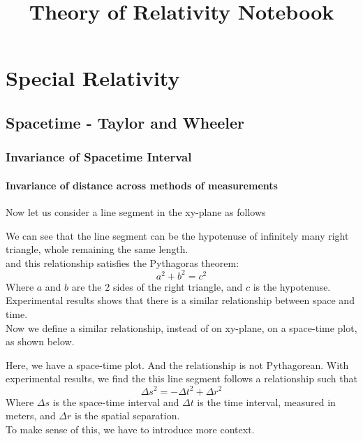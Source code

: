 \documentclass[12pt]{book}
\title{\textbf{Theory of Relativity Notebook}}
\author{Dennis Li \thanks{Prof. Gabriel Perez-Giz \and Manu Dorghabekov}}
\begin{document}
\maketitle
\tableofcontents

\part{Special Relativity}
\chapter{Spacetime - Taylor and Wheeler}
\section{Invariance of Spacetime Interval}

\subsection{Invariance of distance across methods of measurements}

Now let us consider a line segment in the xy-plane as follows
\begin{center}
\end{center}

We can see that the line segment can be the hypotenuse of infinitely many right triangle, whole remaining the same length.\\
and this relationship satisfies the Pythagoras theorem:
\[
a^2+b^2=c^2
\]
Where $a$ and $b$ are the 2 sides of the right triangle, and $c$ is the hypotenuse.\\
Experimental results shows that there is a similar relationship between space and time.\\
Now we define a similar relationship, instead of on xy-plane, on a space-time plot, as shown below. 
\begin{center}
\end{center}
Here, we have a space-time plot. And the relationship is not Pythagorean. With experimental results, we find the this line segment follows a relationship such that
\[
\Delta s^2=-\Delta t^2 + \Delta r^2
\]
Where $\Delta s$ is the space-time interval and $\Delta t$ is the time interval, measured in meters, and $\Delta r$ is the spatial separation.\\
To make sense of this, we have to introduce more context.
\end{document}
